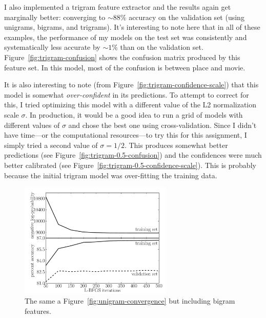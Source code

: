 \documentclass[11pt]{article}
\newcommand{\Fig}[1]{Figure~\ref{fig:#1}}
\newcommand{\fig}[1]{Figure~\ref{fig:#1}}
\newcommand{\figlabel}[1]{\label{fig:#1}}
\newcommand{\code}[1]{{\sffamily #1}}
\begin{document}
I also implemented a trigram feature extractor and the results again get
marginally better: converging to $\sim 88\%$ accuracy on the validation set
(using unigrams, bigrams, and trigrams).
It's interesting to note here that in all of these examples, the performance
of my models on the test set was consistently and systematically less accurate
by $\sim 1\%$ than on the validation set.
\Fig{trigram-confusion} shows the confusion matrix produced by this feature
set.
In this model, most of the confusion is between \code{place} and \code{movie}.

It is also interesting to note (from \fig{trigram-confidence-scale}) that this
model is somewhat \emph{over-confident} in its predictions.
To attempt to correct for this, I tried optimizing this model with a
different value of the L2 normalization scale $\sigma$.
In production, it would be a good idea to run a grid of models with different
values of $\sigma$ and chose the best one using cross-validation.
Since I didn't have time---or the computational resources---to try this for
this assignment, I simply tried a second value of $\sigma = 1/2$.
This produces somewhat better predictions (see \fig{trigram-0.5-confusion})
and the confidences were much better calibrated (see
\fig{trigram-0.5-confidence-scale}).
This is probably because the initial trigram model was over-fitting the
training data.

\begin{figure}[htbp]
\begin{center}
    \includegraphics[width=0.65\textwidth]{bigrams_convergence.pdf}
\end{center}
\caption{%
The same a \fig{unigram-convergence} but including bigram features.
\figlabel{bigram-convergence}}
\end{figure}
\end{document}
